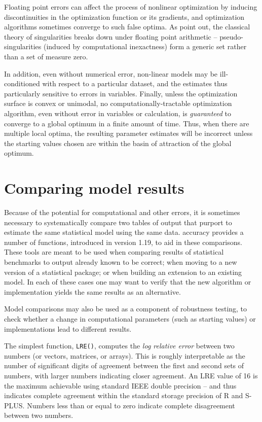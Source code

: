 \documentclass[11pt]{article}
\let\code=\texttt
\let\proglang=\textsf
\newcommand{\pkg}[1]{{\normalfont\fontseries{b}\selectfont #1}}
\begin{document}
Floating point errors can affect the process of nonlinear optimization by inducing discontinuities 
in the optimization function or its gradients, and optimization algorithms sometimes converge to 
such false optima. As \citet{ChaiTrav04a} point out, the classical 
theory of singularities breaks down under floating point arithmetic -- 
pseudo-singularities (induced by computational inexactness) form a generic set rather 
than a set of measure zero. 

In addition, even without numerical error, non-linear models may be ill-conditioned with respect 
to a particular dataset, and the estimates thus particularly sensitive to errors in variables. Finally, 
unless the optimization surface is convex or unimodal, no computationally-tractable optimization 
algorithm, even without error in variables or calculation, is \emph{guaranteed} to converge to a 
global optimum in a finite amount of time. Thus, when there are multiple local optima, the resulting parameter estimates will be incorrect unless the starting values chosen are within the basin of attraction of the global optimum.


\section{Comparing model results}

Because of the potential for computational and other errors, it is sometimes necessary to systematically compare two tables of output that purport to estimate the same statistical model using the same data. \pkg{accuracy} provides a number
 of functions, introduced in version 1.19, to aid in these comparisons. These tools 
 are meant to be used when comparing results of statistical benchmarks to output
already known to be correct; when moving to a new version of
a statistical package; or when building an extension to an existing model. In each of these cases one may want to verify that the new algorithm or implementation yields the same results as an alternative. 

Model comparisons may also be used as a component of robustness testing, to check whether a change in computational parameters 
(such as starting values) or implementations lead to different results. 

The simplest function, \code{LRE()}, computes the \emph{log relative error} between 
two numbers (or vectors, matrices, or arrays). This is roughly interpretable
as the number of significant digits of agreement between the first and second sets
of numbers, with larger numbers indicating closer agreement. An LRE value of 16 is the
maximum achievable using standard IEEE double precision -- and thus indicates complete 
agreement within the standard storage precision of \proglang{R} and \proglang{S-PLUS}.
Numbers less than or equal to zero indicate complete disagreement between two numbers.
\end{document}
